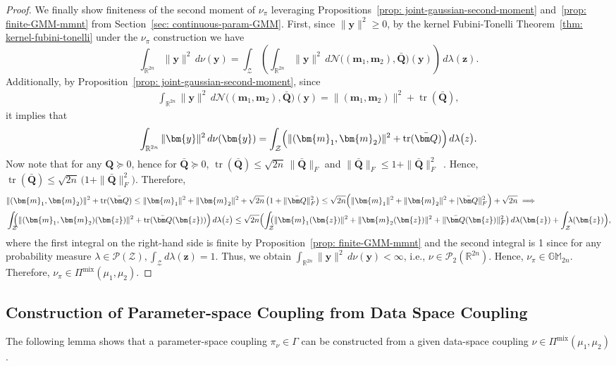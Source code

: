 \documentclass[opre,sglanonrev]{informs4}
\newcommand{\mZ}{\mathcal{Z}}
\newcommand{\mN}{\mathcal{N}}
\newcommand{\mP}{\mathcal{P}}
\newcommand{\mbR}{\mathbb R}
\newcommand{\mbGM}{\mathbb{GM}}
\newcommand{\bmean}{\bm{m}}
\newcommand{\by}{\bm{y}}
\newcommand{\bz}{\bm{z}}
\newcommand{\bQ}{\bm Q}
\newcommand{\Tr}{\operatorname{tr}}
\begin{document}
\begin{proof}
We finally show finiteness of the second moment of $\nu_\pi$ leveraging Propositions~\ref{prop: joint-gaussian-second-moment} and~\ref{prop: finite-GMM-mmnt} from Section~\ref{sec: continuous-param-GMM}. 
First, since $\|\by\|^2\ge 0$, by the kernel Fubini-Tonelli Theorem~\ref{thm: kernel-fubini-tonelli} under the $\nu_\pi$ construction we have
\[
\int_{\mbR^{2n}} \|\by\|^2\,d\nu(\by)
=
\int_{\mZ}\left(\int_{\mbR^{2n}} \|\by\|^2\,
d\mN\!\bigl((\bmean_1,\bmean_2),\bar{\bQ}\bigr)(\by)\right)\,d\lambda(\bz).
\]
Additionally, by Proposition~\ref{prop: joint-gaussian-second-moment}, since
\begin{align*}
\int_{\mbR^{2n}} \|\by\|^2\,
d\mN\!\bigl((\bmean_1,\bmean_2),\bar{\bQ}\bigr)(\by)
=
\|(\bmean_1,\bmean_2)\|^2+\Tr(\bar{\bQ}),
\end{align*} it implies that 
\[
\int_{\mbR^{2n}}\|\by\|^2\,d\nu(\by)
=
\int_{\mZ}\Bigl(\|(\bmean_1,\bmean_2)\|^2+\Tr(\bar{\bQ})\Bigr)\,
d\lambda\bigl(z\bigr).
\]
Now note that for any $\bQ\succeq 0$, hence for $\bar{\bQ}\succeq 0$, $\Tr(\bar{\bQ}) \le \sqrt{2n}\,\|\bar{\bQ}\|_F$ and $\|\bar{\bQ}\|_F\le 1+\|\bar{\bQ}\|_F^2$~\cite{bhatia2009positive, horn2012matrix}. Hence, $\Tr(\bar{\bQ})
\le \sqrt{2n}\,\bigl(1+\|\bar{\bQ}\|_F^2\bigr).$
Therefore,
\begin{align*}
&     \|(\bmean_1,\bmean_2)\|^2+\Tr(\bar{\bQ})
\le
\|\bmean_1\|^2+\|\bmean_2\|^2+\sqrt{2n}\,\bigl(1+\|\bar{\bQ}\|_F^2\bigr) \le \sqrt{2n}\Bigl(\|\bmean_1\|^2+\|\bmean_2\|^2+ |\bar{\bQ}\|^2_F\Bigr) + \sqrt{2n} \implies \\
& \int_{\mZ} \hspace{-5pt}\Bigl(\|(\bmean_1,\bmean_2)(\bz)\|^2+\Tr(\bar{\bQ}(\bz))\Bigr)\,
d\lambda\bigl(z\bigr) \leq \sqrt{2n} \Bigl( \int_{\mZ} \hspace{-5pt}\bigl(\|\bmean_1(\bz)\|^2+\|\bmean_2(\bz)\|^2+\|\bar{\bQ}(\bz)\|_F^2\bigr)\,d\lambda(\bz) + \int_\mZ  \hspace{-5pt}\lambda(\bz) \Bigr),
\end{align*}
where the first integral on the right-hand side is finite by Proposition~\ref{prop: finite-GMM-mmnt} and the second integral is 1 since for any probability measure $\lambda \in \mP(\mZ), \int_\mZ d\lambda(\bz) = 1$. Thus, we obtain $\int_{\mbR^{2n}}\|\by\|^2\,d\nu(\by)<\infty$, i.e., $\nu\in \mP_2(\mbR^{2n})$.
Hence, $\nu_{\pi}\in \mbGM_{2n}$. Therefore, $\nu_\pi \in \Pi^{\mathrm{mix}}(\mu_1, \mu_2)$.
\end{proof}



\subsection{Construction of Parameter-space Coupling from Data Space Coupling}
The following lemma shows that a parameter-space coupling $\pi_\nu \in \Gamma$ can be constructed from a given data-space coupling $\nu \in \Pi^\mathrm{mix}(\mu_1, \mu_2)$.
\end{document}
